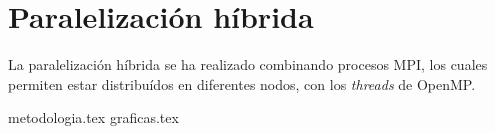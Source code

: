 \section{Paralelización híbrida}
La paralelización híbrida se ha realizado combinando procesos MPI, los cuales permiten estar distribuídos en diferentes nodos, con los \textit{threads} de OpenMP.

{metodologia.tex}
{graficas.tex}